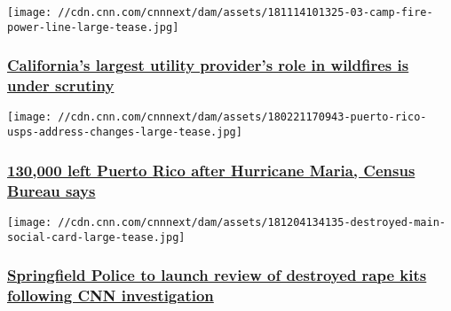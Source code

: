 \href{/2018/12/19/us/camp-fire-pge-invs/index.html}{}

\texttt{[image: //cdn.cnn.com/cnnnext/dam/assets/181114101325-03-camp-fire-power-line-large-tease.jpg]}

\hypertarget{californias-largest-utility-providers-role-in-wildfires-is-under-scrutiny-1}{%
\subsubsection{\texorpdfstring{\href{/2018/12/19/us/camp-fire-pge-invs/index.html}{California's
largest utility provider's role in wildfires is under
scrutiny}}{California's largest utility provider's role in wildfires is under scrutiny}}\label{californias-largest-utility-providers-role-in-wildfires-is-under-scrutiny-1}}

\href{/2018/12/19/health/sutter-puerto-rico-census-update/index.html}{}

\texttt{[image: //cdn.cnn.com/cnnnext/dam/assets/180221170943-puerto-rico-usps-address-changes-large-tease.jpg]}

\hypertarget{130000-left-puerto-rico-after-hurricane-maria-census-bureau-says}{%
\subsubsection{\texorpdfstring{\href{/2018/12/19/health/sutter-puerto-rico-census-update/index.html}{130,000
left Puerto Rico after Hurricane Maria, Census Bureau
says}}{130,000 left Puerto Rico after Hurricane Maria, Census Bureau says}}\label{130000-left-puerto-rico-after-hurricane-maria-census-bureau-says}}

\href{/2018/12/13/health/springfield-missouri-destroyed-rape-kits-me-too/index.html}{}

\texttt{[image: //cdn.cnn.com/cnnnext/dam/assets/181204134135-destroyed-main-social-card-large-tease.jpg]}

\hypertarget{springfield-police-to-launch-review-of-destroyed-rape-kits-following-cnn-investigation}{%
\subsubsection{\texorpdfstring{\href{/2018/12/13/health/springfield-missouri-destroyed-rape-kits-me-too/index.html}{Springfield
Police to launch review of destroyed rape kits following CNN
investigation}}{Springfield Police to launch review of destroyed rape kits following CNN investigation}}\label{springfield-police-to-launch-review-of-destroyed-rape-kits-following-cnn-investigation}}

